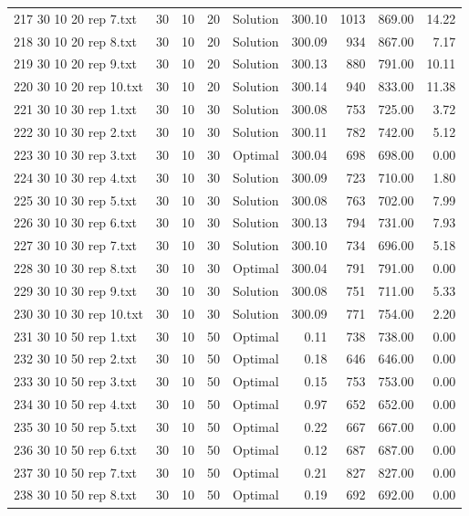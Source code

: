 \begin{longtable}{lrrllrrrr}
217 30 10 20 rep 7.txt & 30 & 10 & 20 & Solution & 300.10 & 1013 & 869.00 & 14.22\\
218 30 10 20 rep 8.txt & 30 & 10 & 20 & Solution & 300.09 & 934 & 867.00 &  7.17\\
219 30 10 20 rep 9.txt & 30 & 10 & 20 & Solution & 300.13 & 880 & 791.00 & 10.11\\
220 30 10 20 rep 10.txt & 30 & 10 & 20 & Solution & 300.14 & 940 & 833.00 & 11.38\\
221 30 10 30 rep 1.txt & 30 & 10 & 30 & Solution & 300.08 & 753 & 725.00 &  3.72\\
222 30 10 30 rep 2.txt & 30 & 10 & 30 & Solution & 300.11 & 782 & 742.00 &  5.12\\
223 30 10 30 rep 3.txt & 30 & 10 & 30 & Optimal & 300.04 & 698 & 698.00 &  0.00\\
224 30 10 30 rep 4.txt & 30 & 10 & 30 & Solution & 300.09 & 723 & 710.00 &  1.80\\
225 30 10 30 rep 5.txt & 30 & 10 & 30 & Solution & 300.08 & 763 & 702.00 &  7.99\\
226 30 10 30 rep 6.txt & 30 & 10 & 30 & Solution & 300.13 & 794 & 731.00 &  7.93\\
227 30 10 30 rep 7.txt & 30 & 10 & 30 & Solution & 300.10 & 734 & 696.00 &  5.18\\
228 30 10 30 rep 8.txt & 30 & 10 & 30 & Optimal & 300.04 & 791 & 791.00 &  0.00\\
229 30 10 30 rep 9.txt & 30 & 10 & 30 & Solution & 300.08 & 751 & 711.00 &  5.33\\
230 30 10 30 rep 10.txt & 30 & 10 & 30 & Solution & 300.09 & 771 & 754.00 &  2.20\\
231 30 10 50 rep 1.txt & 30 & 10 & 50 & Optimal &  0.11 & 738 & 738.00 &  0.00\\
232 30 10 50 rep 2.txt & 30 & 10 & 50 & Optimal &  0.18 & 646 & 646.00 &  0.00\\
233 30 10 50 rep 3.txt & 30 & 10 & 50 & Optimal &  0.15 & 753 & 753.00 &  0.00\\
234 30 10 50 rep 4.txt & 30 & 10 & 50 & Optimal &  0.97 & 652 & 652.00 &  0.00\\
235 30 10 50 rep 5.txt & 30 & 10 & 50 & Optimal &  0.22 & 667 & 667.00 &  0.00\\
236 30 10 50 rep 6.txt & 30 & 10 & 50 & Optimal &  0.12 & 687 & 687.00 &  0.00\\
237 30 10 50 rep 7.txt & 30 & 10 & 50 & Optimal &  0.21 & 827 & 827.00 &  0.00\\
238 30 10 50 rep 8.txt & 30 & 10 & 50 & Optimal &  0.19 & 692 & 692.00 &  0.00\\

\end{longtable}
